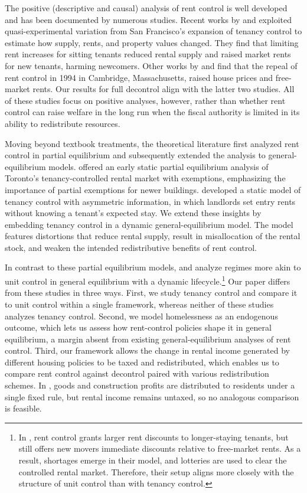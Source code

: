 \documentclass[parskip=full]{article}
\begin{document}
The positive (descriptive and causal) analysis of rent control is well developed and has been documented by numerous studies. Recent works by \citet{diamond-2019} and \citet{dmq-2019} exploited quasi-experimental variation from San Francisco’s expansion of tenancy control to estimate how supply, rents, and property values changed. They find that limiting rent increases for sitting tenants reduced rental supply and raised market rents for new tenants, harming newcomers. Other works by \citet{sims-2007} and \citet{app-2014} find that the repeal of rent control in 1994 in Cambridge, Massachusetts, raised house prices and free-market rents. Our results for full decontrol align with the latter two studies. All of these studies focus on positive analyses, however, rather than whether rent control can raise welfare in the long run when the fiscal authority is limited in its ability to redistribute resources.

Moving beyond textbook treatments, the theoretical literature first analyzed rent control in partial equilibrium and subsequently extended the analysis to general-equilibrium models. \citet{fallis-1985} offered an early static partial equilibrium analysis of Toronto’s tenancy-controlled rental market with exemptions, emphasizing the importance of partial exemptions for newer buildings. \citet{be-2000} developed a static model of tenancy control with asymmetric information, in which landlords set entry rents without knowing a tenant’s expected stay. We extend these insights by embedding tenancy control in a dynamic general-equilibrium model. The model features distortions that reduce rental supply, result in misallocation of the rental stock, and weaken the intended redistributive benefits of rent control.

In contrast to these partial equilibrium models, \citet{eric-1995} and \citet{fmn-2023} analyze regimes more akin to unit control in general equilibrium with a dynamic lifecycle.\footnote{In \citet{fmn-2023}, rent control grants larger rent discounts to longer-staying tenants, but still offers new movers immediate discounts relative to free-market rents. As a result, shortages emerge in their model, and lotteries are used to clear the controlled rental market. Therefore, their setup aligns more closely with the structure of unit control than with tenancy control.} Our paper differs from these studies in three ways. First, we study tenancy control and compare it to unit control within a single framework, whereas neither of these studies analyzes tenancy control. Second, we model homelessness as an endogenous outcome, which lets us assess how rent-control policies shape it in general equilibrium, a margin absent from existing general-equilibrium analyses of rent control. Third, our framework allows the change in rental income generated by different housing policies to be taxed and redistributed, which enables us to compare rent control against decontrol paired with various redistribution schemes. In \citet{fmn-2023}, goods and construction profits are distributed to residents under a single fixed rule, but rental income remains untaxed, so no analogous comparison is feasible.
\end{document}

